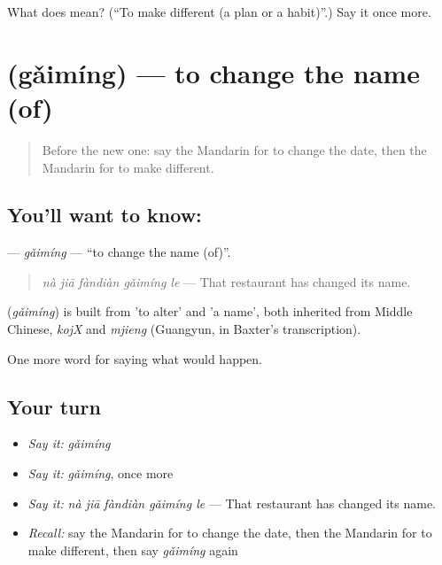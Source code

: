 \begin{tcolorbox}[breakable,colback=teal!4,colframe=teal!35!black,title={Before you move on}]
What does  mean? (\textquotedblleft{}To make different (a plan or a habit)\textquotedblright{}.) Say it once more.
\end{tcolorbox}
\section[\texorpdfstring{\zh{改名} (gǎimíng)}{改名 (gǎimíng)}]{ (gǎimíng) — to change the name (of)}

\label{lesson:ZH-C392-gaiming}



\begin{quote}
Before the new one: say the Mandarin for to change the date, then the Mandarin for to make different.
\end{quote}

\subsection*{You'll want to know: }
\textbf{} — \emph{gǎimíng} — \textquotedblleft{}to change the name (of)\textquotedblright{}.

\begin{quote}
\textbf{} \emph{nà jiā fàndiàn gǎimíng le} — That restaurant has changed its name.
\end{quote}

\begin{cousinweb}
\textbf{} (\emph{gǎimíng}) is built from  'to alter' and  'a name', both inherited from Middle Chinese, \emph{kojX} and \emph{mjieng} (Guangyun, in Baxter's transcription).
\end{cousinweb}

\begin{grammarlens}[title={What you've built}]
One more word for saying what would happen.
\end{grammarlens}

\subsection*{Your turn}
\begin{itemize}
\raggedright
  \item \emph{Say it:} \emph{gǎimíng}
  \item \emph{Say it:} \emph{gǎimíng}, once more
  \item \emph{Say it:} \emph{nà jiā fàndiàn gǎimíng le} — That restaurant has changed its name.
  \item \emph{Recall:} say the Mandarin for to change the date, then the Mandarin for to make different, then say \emph{gǎimíng} again
\end{itemize}

